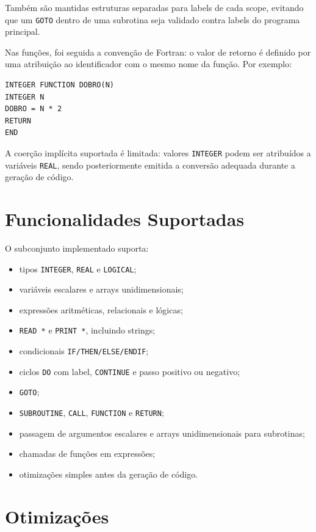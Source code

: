 \documentclass[11pt,a4paper]{article}
\begin{document}
Também são mantidas estruturas separadas para labels de cada scope, evitando que um \texttt{GOTO} dentro de uma subrotina seja validado contra labels do programa principal.

Nas funções, foi seguida a convenção de Fortran: o valor de retorno é definido por uma atribuição ao identificador com o mesmo nome da função. Por exemplo:

\begin{lstlisting}
INTEGER FUNCTION DOBRO(N)
INTEGER N
DOBRO = N * 2
RETURN
END
\end{lstlisting}

A coerção implícita suportada é limitada: valores \texttt{INTEGER} podem ser atribuídos a variáveis \texttt{REAL}, sendo posteriormente emitida a conversão adequada durante a geração de código.

\section{Funcionalidades Suportadas}

O subconjunto implementado suporta:

\begin{itemize}
    \item tipos \texttt{INTEGER}, \texttt{REAL} e \texttt{LOGICAL};
    \item variáveis escalares e arrays unidimensionais;
    \item expressões aritméticas, relacionais e lógicas;
    \item \texttt{READ *} e \texttt{PRINT *}, incluindo strings;
    \item condicionais \texttt{IF/THEN/ELSE/ENDIF};
    \item ciclos \texttt{DO} com label, \texttt{CONTINUE} e passo positivo ou negativo;
    \item \texttt{GOTO};
    \item \texttt{SUBROUTINE}, \texttt{CALL}, \texttt{FUNCTION} e \texttt{RETURN};
    \item passagem de argumentos escalares e arrays unidimensionais para subrotinas;
    \item chamadas de funções em expressões;
    \item otimizações simples antes da geração de código.
\end{itemize}

\section{Otimizações}
\end{document}
